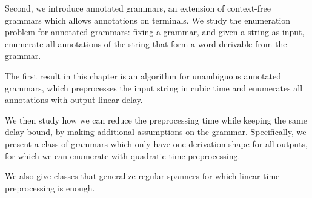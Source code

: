 Second, we introduce annotated grammars, an extension of context-free grammars which allows annotations on terminals. We study the enumeration problem for annotated grammars: fixing a grammar, and given a string as input, enumerate all annotations of the string that form a word derivable from the grammar. 

The first result in this chapter is an algorithm for unambiguous annotated grammars, which preprocesses the input string in cubic time and enumerates all annotations with output-linear delay. 

We then study how we can reduce the preprocessing time while keeping the same delay bound, by making additional assumptions on the grammar. Specifically, we present a class of grammars which only have one derivation shape for all outputs, for which we can enumerate with quadratic time preprocessing. 

We also give classes that generalize regular spanners for which linear time preprocessing is enough.
